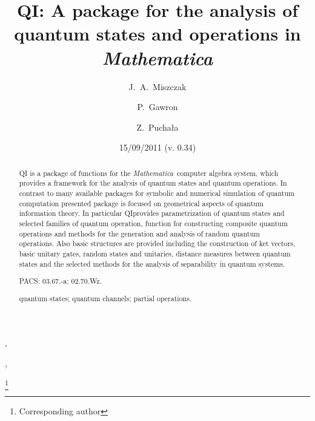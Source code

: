 \documentclass[a4paper,11pt]{elsart}
\newcommand{\Mathematica}{\emph{Mathematica}}
\newcommand{\1}{{\rm 1\hspace{-0.9mm}l}}
\newcommand{\qi}{QI}
\begin{document}
\lstset{language=Mathematica,frame=lines}

\begin{frontmatter}



\title{\qi: A package for the analysis of quantum states and operations in
\Mathematica}

\date{15/09/2011 (v. 0.34)}

\author{J.~A.~Miszczak},
\author{P.~Gawron},
\author{Z.~Pucha{\l}a}

\thanks[author]{Corresponding author}

\address{Institute of Theoretical and Applied Informatics, Polish Academy of 
Sciences, Ba{\l}tycka 5, 44-100 Gliwice, Poland}

\begin{abstract}
QI is a package of functions for the \Mathematica\ computer algebra system,
which provides a framework for the analysis of quantum states and quantum
operations. In contrast to many available packages for symbolic and numerical
simulation of quantum computation presented package is focused on geometrical
aspects of quantum information theory. In particular \qi provides
parametrization of quantum states and selected families of quantum operation,
function for constructing composite quantum operations and methods for the
generation and analysis of random quantum operations. Also basic structures are
provided including the construction of ket vectors, basic unitary gates, random
states and unitaries, distance measures between quantum states and the selected
methods for the analysis of separability in quantum systems.

\begin{flushleft}
PACS: 03.67.-a; 02.70.Wz.
\end{flushleft}

\begin{keyword}
quantum states; quantum channels; partial operations.
\end{keyword}
\end{abstract}

\end{frontmatter}
\end{document}
